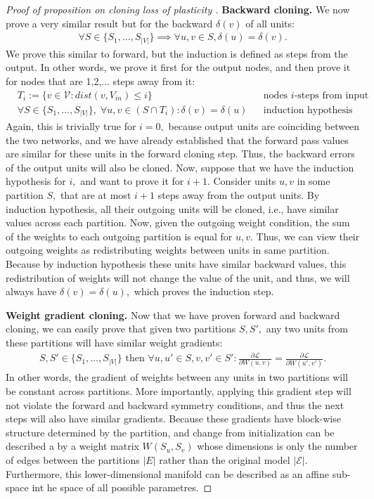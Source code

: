 \documentclass[11pt]{article}
\newcommand{\Loss}{\mathcal{L}}
\begin{document}
\begin{proof}[Proof of proposition on cloning loss of plasticity ]
    \textbf{Backward cloning. } We now prove a very similar result but for the backward $\delta(v)$ of all units:
        \begin{align*}
        \forall S \in \{S_1,\dots,S_{|V|}\} \implies \forall u,v \in S, \delta(u) = \delta(v). 
    \end{align*}
    We prove this similar to forward, but the induction is defined as steps from the output. In other words, we prove it first for the output nodes, and then prove it for nodes that are 1,2,... steps away from it: 
        \begin{align*}
        &T_i:= \{v\in \mathcal{V}: dist(v,V_{in}) \le i\} && \text{nodes $i$-steps from input}\\
        &\forall S \in \{S_1,\dots,S_{|V|}\}, \; \forall u,v \in (S\cap T_i): \delta(v) = \delta(u)  && \text{induction hypothesis}
    \end{align*}
    Again, this is trivially true for $i=0,$ because output units are coinciding between the two networks, and we have already established that the forward pass values are similar for these units in the forward cloning step. Thus, the backward errors of the output units will also be cloned. Now, suppose that we have the induction hypothesis for $i,$ and want to prove it for $i+1.$ Consider units $u,v$ in some partition $S,$ that are at most $i+1$ steps away from the output units. By induction hypothesis, all their outgoing units will be cloned, i.e., have similar values across each partition. Now, given the outgoing weight condition, the sum of the weights to each outgoing partition is equal for $u,v.$ Thus, we can view their outgoing weights as redistributing weights between units in same partition. Because by induction hypothesis these units have similar backward values, this redistribution of weights will not change the value of the unit, and thus, we will always have $\delta(v) = \delta(u),$ which proves the induction step.

    \textbf{Weight gradient cloning.} Now that we have proven forward and backward cloning, we can easily prove that given two partitions $S, S',$ any two units from these partitions will have similar weight gradients:
    \begin{align*}
        S,S' \in \{S_1,\dots, S_{|V|}\} \text{ then } \forall u,u' \in S, v,v'\in S': \frac{\partial \Loss}{\partial W(u,v)}=\frac{\partial \Loss}{\partial W(u',v')}.
    \end{align*}
    In other words, the gradient of weights between any units in two partitions will be constant across partitions. More importantly, applying this gradient step will not violate the forward and backward symmetry conditions, and thus the next steps will also have similar gradients. Because these gradients have block-wise structure determined by the partition, and change from initialization can be described a by a weight matrix $W(S_u,S_v)$ whose dimensions is only the number of edges between the partitions $|E|$ rather than the original model $|\mathcal{E}|$. Furthermore, this lower-dimensional manifold can be described as an affine sub-space int he space of all possible parametres. 
\end{proof}
\end{document}
